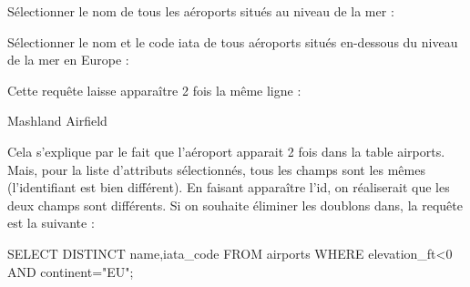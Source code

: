 \documentclass[10pt]{article}
\newif\ifprofvar
\begin{document}
\begin{exemple}
Sélectionner le nom de tous les aéroports situés au niveau de la mer :

\ifprofvar
$$
\pi_{\text{name}}\left(\sigma_{\text{elevation\_ft = 0}}(\text{airports})\right)
$$
\begin{envsql}
\begin{sql}
SELECT * FROM airports WHERE elevation_ft=0
\end{sql}
\end{envsql}
\else
\vspace{3cm}
\fi

Sélectionner le nom et le code iata de tous aéroports situés en-dessous du niveau de la mer en Europe :
\ifprofvar
$$
\pi_{\text{name},\text{iata\_code}}\left(\sigma_{\text{elevation\_ft} < \text{0}\wedge \text{continent}=\text{EU})}(\text{airports} )\right)
$$
\begin{envsql}
\begin{sql}
SELECT name,iata_code FROM airports WHERE elevation_ft<0 AND continent="EU";
\end{sql}
\end{envsql}
\else
\vspace{3cm}
\fi


Cette requête laisse apparaître 2 fois la même ligne : 
\begin{sql}
Mashland Airfield   
\end{sql}
Cela s'explique par le fait que l'aéroport apparait 2 fois dans la table airports. Mais, pour la liste d'attributs sélectionnés, tous les champs sont les mêmes (l'identifiant est bien différent). En faisant apparaître l'id, on réaliserait que les deux champs sont différents. 
Si on souhaite éliminer les doublons dans, la requête est la suivante : 

\begin{envsql}
\begin{sql}
SELECT DISTINCT name,iata_code FROM airports WHERE elevation_ft<0 AND continent="EU";
\end{sql}

\end{envsql}

\end{exemple}
\end{document}
